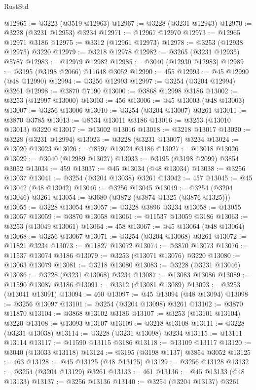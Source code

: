 \begin{lexlean}{RustStd}
\begin{coremodule}
@12965 := @3223 (@3519 @12963)
@12967 := @3228 (@3231 @12943)
@12970 := @3228 (@3231 @12953) @3234
@12971 := @12967 @12970
@12973 := @12965 @12971 @3186
@12975 := @3312 (@12961 @12973)
@12978 := @3253 (@12938 @12975) @3220
@12979 := @3218 @12978
@12982 := @3265 (@3231 @12935) @5787
@12983 := @12979 @12982
@12985 := @3040 (@12930 @12983)
@12989 := @3195 (@3198 @2066) @11648 @3052
@12990 := 455
@12993 := @45 @12990 (@48 @12990)
@12994 := @3256 @12993
@12997 := @3254 (@3204 @12994) @3261
@12998 := @3870 @7190
@13000 := @3868 @12998 @3186
@13002 := @3253 (@12997 @13000)
@13003 := 456
@13006 := @45 @13003 (@48 @13003)
@13007 := @3256 @13006
@13010 := @3254 (@3204 @13007) @3261
@13011 := @3870 @3785
@13013 := @8534 @13011 @3186
@13016 := @3253 (@13010 @13013) @3220
@13017 := @13002 @13016
@13018 := @3218 @13017
@13020 := @3228 (@3231 @12994)
@13023 := @3228 (@3231 @13007) @3234
@13024 := @13020 @13023
@13026 := @8597 @13024 @3186
@13027 := @13018 @13026
@13029 := @3040 (@12989 @13027)
@13033 := @3195 (@3198 @2099) @3854 @3052
@13034 := 459
@13037 := @45 @13034 (@48 @13034)
@13038 := @3256 @13037
@13041 := @3254 (@3204 @13038) @3261
@13042 := 457
@13045 := @45 @13042 (@48 @13042)
@13046 := @3256 @13045
@13049 := @3254 (@3204 @13046) @3261
@13054 := @3680 (@3872 (@3874 @1325 (@3876 @1325)))
@13055 := @3228 @13054
@13057 := @3228 @3896 @3234
@13058 := @13055 @13057
@13059 := @3870 @13058
@13061 := @11537 @13059 @3186
@13063 := @3253 (@13049 @13061)
@13064 := 458
@13067 := @45 @13064 (@48 @13064)
@13068 := @3256 @13067
@13071 := @3254 (@3204 @13068) @3261
@13072 := @11821 @3234
@13073 := @11827 @13072
@13074 := @3870 @13073
@13076 := @11537 @13074 @3186
@13079 := @3253 (@13071 @13076) @3220
@13080 := @13063 @13079
@13081 := @3218 @13080
@13083 := @3228 (@3231 @13046)
@13086 := @3228 (@3231 @13068) @3234
@13087 := @13083 @13086
@13089 := @11590 @13087 @3186
@13091 := @3312 (@13081 @13089)
@13093 := @3253 (@13041 @13091)
@13094 := 460
@13097 := @45 @13094 (@48 @13094)
@13098 := @3256 @13097
@13101 := @3254 (@3204 @13098) @3261
@13102 := @3870 @11870
@13104 := @3868 @13102 @3186
@13107 := @3253 (@13101 @13104) @3220
@13108 := @13093 @13107
@13109 := @3218 @13108
@13111 := @3228 (@3231 @13038)
@13114 := @3228 (@3231 @13098) @3234
@13115 := @13111 @13114
@13117 := @11590 @13115 @3186
@13118 := @13109 @13117
@13120 := @3040 (@13033 @13118)
@13124 := @3195 (@3198 @1137) @3854 @3052
@13125 := 463
@13128 := @45 @13125 (@48 @13125)
@13129 := @3256 @13128
@13132 := @3254 (@3204 @13129) @3261
@13133 := 461
@13136 := @45 @13133 (@48 @13133)
@13137 := @3256 @13136
@13140 := @3254 (@3204 @13137) @3261

\end{coremodule}
\end{lexlean}
